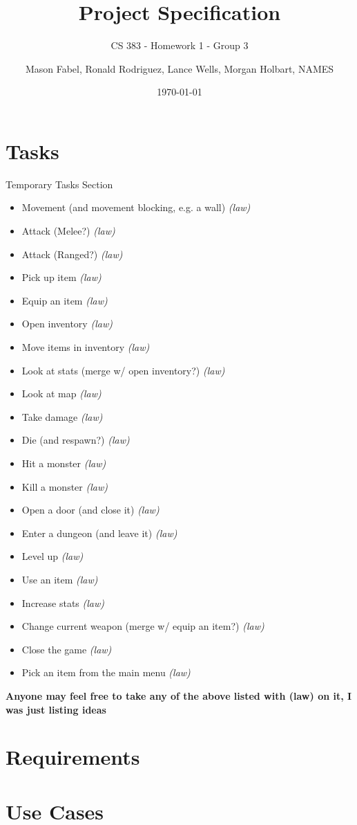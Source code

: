 \documentclass[12pt]{report}
\title{Project Specification}
\subtitle{CS 383 - Homework 1 - Group 3}
\author{Mason Fabel, Ronald Rodriguez, Lance Wells, Morgan Holbart, NAMES} %
\date{\today}
\begin{document}
\maketitle


\chapter{Tasks}

\begin{section}{Temporary Tasks Section}

\begin{itemize}
\item	Movement (and movement blocking, e.g. a wall) \textit{(law)}
\item	Attack (Melee?) \textit{(law)}
\item	Attack (Ranged?) \textit{(law)}
\item	Pick up item \textit{(law)}
\item	Equip an item \textit{(law)}
\item	Open inventory \textit{(law)}
\item	Move items in inventory \textit{(law)}
\item	Look at stats (merge w/ open inventory?) \textit{(law)}
\item	Look at map \textit{(law)}
\item	Take damage \textit{(law)}
\item	Die (and respawn?) \textit{(law)}
\item	Hit a monster \textit{(law)}
\item	Kill a monster \textit{(law)}
\item	Open a door (and close it) \textit{(law)}
\item	Enter a dungeon (and leave it) \textit{(law)}
\item	Level up \textit{(law)}
\item	Use an item \textit{(law)}
\item	Increase stats \textit{(law)}
\item	Change current weapon (merge w/ equip an item?) \textit{(law)}
\item	Close the game \textit{(law)}
\item	Pick an item from the main menu \textit{(law)}
\end{itemize}

\large \textbf{Anyone may feel free to take any of the above listed with (law) on it, 
I was just listing ideas}

\end{section}

\chapter{Requirements}

\chapter{Use Cases}
\end{document}
